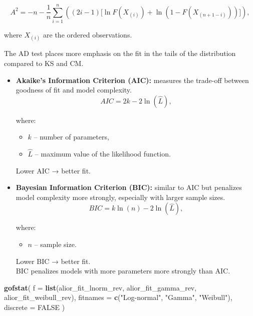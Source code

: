 \documentclass[
]{article}
\newenvironment{Shaded}{\begin{snugshade}}{\end{snugshade}}
\newcommand{\AttributeTok}[1]{\textcolor[rgb]{0.13,0.29,0.53}{#1}}
\newcommand{\ConstantTok}[1]{\textcolor[rgb]{0.56,0.35,0.01}{#1}}
\newcommand{\FunctionTok}[1]{\textcolor[rgb]{0.13,0.29,0.53}{\textbf{#1}}}
\newcommand{\NormalTok}[1]{#1}
\newcommand{\StringTok}[1]{\textcolor[rgb]{0.31,0.60,0.02}{#1}}
\providecommand{\tightlist}{%
  \setlength{\itemsep}{0pt}\setlength{\parskip}{0pt}}
\begin{document}
\[
A^2 = -n - \frac{1}{n} \sum_{i=1}^n \left( (2i-1)\big[\ln F(X_{(i)}) + \ln(1 - F(X_{(n+1-i)}))\big] \right),
\]

where \(X_{(i)}\) are the ordered observations.

The AD test places more emphasis on the fit in the tails of the
distribution compared to KS and CM.

\begin{itemize}
\item
  \textbf{Akaike's Information Criterion (AIC):} measures the trade-off
  between goodness of fit and model complexity.\\
  \[
  AIC = 2k - 2 \ln(\hat{L}),
  \]

  where:

  \begin{itemize}
  \tightlist
  \item
    \(k\) -- number of parameters,\\
  \item
    \(\hat{L}\) -- maximum value of the likelihood function.
  \end{itemize}

  Lower AIC → better fit.
\item
  \textbf{Bayesian Information Criterion (BIC):} similar to AIC but
  penalizes model complexity more strongly, especially with larger
  sample sizes.\\
  \[
  BIC = k \ln(n) - 2 \ln(\hat{L}),
  \]

  where:

  \begin{itemize}
  \tightlist
  \item
    \(n\) -- sample size.
  \end{itemize}

  Lower BIC → better fit.\\
  BIC penalizes models with more parameters more strongly than AIC.
\end{itemize}

\begin{Shaded}
\begin{Highlighting}[]
\FunctionTok{gofstat}\NormalTok{(}
  \AttributeTok{f =} \FunctionTok{list}\NormalTok{(alior\_fit\_lnorm\_rev, alior\_fit\_gamma\_rev, alior\_fit\_weibull\_rev),}
  \AttributeTok{fitnames =} \FunctionTok{c}\NormalTok{(}\StringTok{"Log{-}normal"}\NormalTok{, }\StringTok{"Gamma"}\NormalTok{, }\StringTok{"Weibull"}\NormalTok{),}
  \AttributeTok{discrete =} \ConstantTok{FALSE}
\NormalTok{)}
\end{Highlighting}
\end{Shaded}
\end{document}
